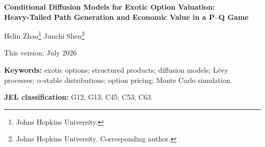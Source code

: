 \documentclass[12pt,letterpaper]{article}
\begin{document}
\begin{titlepage}
\begin{center}
\vspace*{1.2cm}
{\Large\bfseries Conditional Diffusion Models for Exotic Option Valuation:\\[4pt]
Heavy-Tailed Path Generation and Economic Value in a P--Q Game\par}

\vspace{1.4cm}
{\large Helin Zhao\footnote{Johns Hopkins University.}
\qquad
Junchi Shen\footnote{Johns Hopkins University. Corresponding author.}\par}

\vspace{0.8cm}
{This version: July 2026\par}
\end{center}

\vspace{1.2cm}
\begin{abstract}
\noindent
We study conditional denoising diffusion models as path generators for exotic
option valuation on Chinese equity indices. Holding a conditional U-Net
backbone fixed, we compare three generators: a Gaussian diffusion model
(DDPM) trained with a composite finance-aware loss, the same model trained
with the plain denoising loss, and a heavy-tailed Denoising L\'evy
Probabilistic Model (DLPM) driven by $\alpha$-stable noise and trained with
its standard loss. On held-out windows, the DLPM dominates both Gaussian
variants on distributional fidelity---halving the Kolmogorov--Smirnov
statistic and reducing Wasserstein distance and mean error severalfold---
while the composite loss, not the driving noise, governs pooled tail mass at
this training scale. Benchmarked further against a maximum-likelihood neural
SDE and a zero-shot time-series foundation model, the DLPM offers the
strongest balance of conditional shape fidelity among generators with a
heavy-tail mechanism. We further propose a P--Q dynamic game in which the
diffusion trader (P) quotes against a geometric Brownian motion market maker
(Q) across five product families. The P-model earns robust profits on
European and Asian options, while losses on lookbacks, accumulators, and
deep knock-in snowballs trace directly to the Gaussian generator's tail
underestimation. Replaying the game with matched-budget generators, the
DLPM converts the Gaussian model's deep knock-in snowball losses into large
stable profits with balanced positioning---distributional fidelity
monetizes precisely where tails dominate.
\end{abstract}

\vspace{0.6cm}
\noindent\textbf{Keywords:} exotic options; structured products; diffusion
models; L\'evy processes; $\alpha$-stable distributions; option pricing;
Monte Carlo simulation.

\medskip
\noindent\textbf{JEL classification:} G12; G13; C45; C53; C63.
\end{titlepage}
\end{document}
